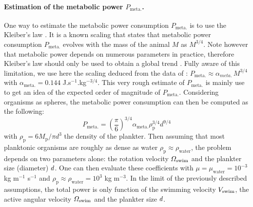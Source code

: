 \paragraph{Estimation of the metabolic power $P_{\mathrm{meta.}}$.}

One way to estimate the metabolic power consumption $P_{\mathrm{meta.}}$ is to use the Kleiber's law \citep{kleiber1961fire}.
It is a known scaling that states that metabolic power consumption $P_{\mathrm{meta.}}$ evolves with the mass of the animal $M$ as $M^{3/4}$.
Note however that metabolic power depends on numerous parameters in practice, therefore Kleiber's law should only be used to obtain a global trend \citep{glazier2005beyond}.
Fully aware of this limitation, we use here the scaling deduced from the data of \citet{gillooly2001effects}: $P_{\mathrm{meta.}} \approx \alpha_{meta.} \, M^{3/4}$ with $\alpha_{\mathrm{meta.}} = 0.144$ J.s$^{-1}$.kg$^{-3/4}$.
This very rough estimate of $P_{\mathrm{meta.}}$ is mainly use to get an idea of the expected order of magnitude of $P_{\mathrm{meta.}}$.
Considering organisms as spheres, the metabolic power consumption can then be computed as the following:
\begin{equation}\label{eq:kleiber}
	P_{\mathrm{meta.}} = \left( \frac{\pi}{6} \right)^{3/4} \alpha_{\mathrm{meta.}} \rho_{\mathrm{p}}^{3/4} d^{9/4}
\end{equation}
with $\rho_{\mathrm{p}} = 6 M_{\mathrm{p}} / \pi d^3$ the density of the plankter.
Then assuming that most planktonic organisms are roughly as dense as water $\rho_{\mathrm{p}} \approx \rho_{\mathrm{water}}$, the problem depends on two parameters alone: the rotation velocity $\varOmega_{\mathrm{swim}}$ and the plankter size (diameter) $d$.
One can then evaluate these coefficients with $\mu = \mu_{\mathrm{water}} = 10^{-3}$ kg m$^{-1}$ s$^{-1}$ and $\rho_{\mathrm{p}} \approx \rho_{\mathrm{water}} = 10^{3}$ kg m$^{-3}$.
In the limit of the previously described assumptions, the total power is only function of the swimming velocity $V_{\mathrm{swim}}$, the active angular velocity $\varOmega_{\mathrm{swim}}$ and the plankter size $d$.

